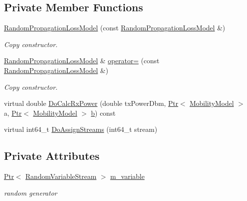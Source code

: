 \subsection*{Private Member Functions}
\begin{DoxyCompactItemize}
\item 
\hyperlink{classns3_1_1RandomPropagationLossModel_a616326b74db809e0335c3e52e95a17d0}{Random\+Propagation\+Loss\+Model} (const \hyperlink{classns3_1_1RandomPropagationLossModel}{Random\+Propagation\+Loss\+Model} \&)
\begin{DoxyCompactList}\small\item\em Copy constructor. \end{DoxyCompactList}\item 
\hyperlink{classns3_1_1RandomPropagationLossModel}{Random\+Propagation\+Loss\+Model} \& \hyperlink{classns3_1_1RandomPropagationLossModel_ab7219674cd916036e6962fbc58657347}{operator=} (const \hyperlink{classns3_1_1RandomPropagationLossModel}{Random\+Propagation\+Loss\+Model} \&)
\begin{DoxyCompactList}\small\item\em Copy constructor. \end{DoxyCompactList}\item 
virtual double \hyperlink{classns3_1_1RandomPropagationLossModel_ad0d085f84cfac5c2c9484bef7e7c0aed}{Do\+Calc\+Rx\+Power} (double tx\+Power\+Dbm, \hyperlink{classns3_1_1Ptr}{Ptr}$<$ \hyperlink{classns3_1_1MobilityModel}{Mobility\+Model} $>$ a, \hyperlink{classns3_1_1Ptr}{Ptr}$<$ \hyperlink{classns3_1_1MobilityModel}{Mobility\+Model} $>$ \hyperlink{lte__pathloss_8m_a21ad0bd836b90d08f4cf640b4c298e7c}{b}) const 
\item 
virtual int64\+\_\+t \hyperlink{classns3_1_1RandomPropagationLossModel_a57790fe1c43bc7550fd9e111201d67b9}{Do\+Assign\+Streams} (int64\+\_\+t stream)
\end{DoxyCompactItemize}
\subsection*{Private Attributes}
\begin{DoxyCompactItemize}
\item 
\hyperlink{classns3_1_1Ptr}{Ptr}$<$ \hyperlink{classns3_1_1RandomVariableStream}{Random\+Variable\+Stream} $>$ \hyperlink{classns3_1_1RandomPropagationLossModel_ab627114b1d471e4b5d2192ed3542c7af}{m\+\_\+variable}
\begin{DoxyCompactList}\small\item\em random generator \end{DoxyCompactList}\end{DoxyCompactItemize}

